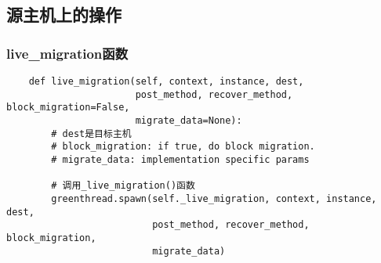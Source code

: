 \documentclass[a4paper,left=1.5cm,right=1.5cm,11pt]{article}
\begin{document}
\subsection{源主机上的操作}
\subsubsection{live\_migration函数}
	\begin{lstlisting}
	def live_migration(self, context, instance, dest,
                       post_method, recover_method, block_migration=False,
                       migrate_data=None):
		# dest是目标主机
        # block_migration: if true, do block migration.
        # migrate_data: implementation specific params

        # 调用_live_migration()函数
        greenthread.spawn(self._live_migration, context, instance, dest,
                          post_method, recover_method, block_migration,
                          migrate_data)
	\end{lstlisting}
\end{document}
